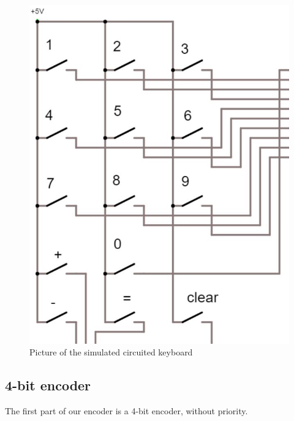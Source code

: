 \documentclass{article}
\begin{document}
\begin{figure}[h]
    \centering
    \includegraphics[scale=.3]{IM_Keyboard}
    \caption{Picture of the simulated circuited keyboard}
    \label{Keybaord}
\end{figure}

\clearpage

\subsection{4-bit encoder}
The first part of our encoder is a 4-bit encoder, without priority. 
\end{document}
